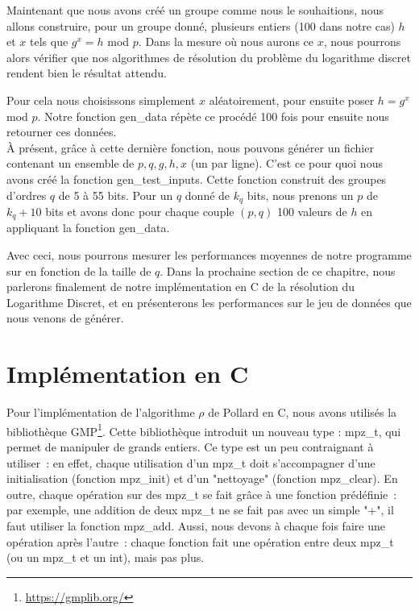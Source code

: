         Maintenant que nous avons créé un groupe comme nous le souhaitions, nous allons construire, pour un groupe donné, plusieurs entiers (100 dans notre cas) $h$ et $x$ tels que $g^x = h$ mod $p$. Dans la mesure où nous aurons ce $x$, nous pourrons alors vérifier que nos algorithmes de résolution du problème du logarithme discret rendent bien le résultat attendu.

        Pour cela nous choisissons simplement $x$ aléatoirement, pour ensuite poser $h = g^x$ mod $p$. Notre fonction gen\_data répète ce procédé 100 fois pour ensuite nous retourner ces données.\\

        À présent, grâce à cette dernière fonction, nous pouvons générer un fichier contenant un ensemble de $p, q, g, h, x$ (un par ligne). C'est ce pour quoi nous avons créé la fonction gen\_test\_inputs. Cette fonction construit des groupes d'ordres $q$ de 5 à 55 bits. Pour un $q$ donné de $k_q$ bits, nous prenons un $p$ de $k_q + 10$ bits et avons donc pour chaque couple $(p,q)$ 100 valeurs de $h$ en appliquant la fonction gen\_data.

        Avec ceci, nous pourrons mesurer les performances moyennes de notre programme sur en fonction de la taille de $q$. Dans la prochaine section de ce chapitre, nous parlerons finalement de notre implémentation en C de la résolution du Logarithme Discret, et en présenterons les performances sur le jeu de données que nous venons de générer.

        \section{Implémentation en C}
          Pour l'implémentation de l'algorithme $\rho$ de Pollard en C, nous avons utilisés la bibliothèque GMP\footnote{\url{https://gmplib.org/}}. Cette bibliothèque introduit un nouveau type : mpz\_t, qui permet de manipuler de grands entiers. Ce type est un peu contraignant à utiliser~: en effet, chaque utilisation d'un mpz\_t doit s'accompagner d'une initialisation (fonction mpz\_init) et d'un "nettoyage" (fonction mpz\_clear). En outre, chaque opération sur des mpz\_t se fait grâce à une fonction prédéfinie~: par exemple, une addition de deux mpz\_t ne se fait pas avec un simple "+", il faut utiliser la fonction mpz\_add. Aussi, nous devons à chaque fois faire une opération après l'autre~: chaque fonction fait une opération entre deux mpz\_t (ou un mpz\_t et un int), mais pas plus.\\

